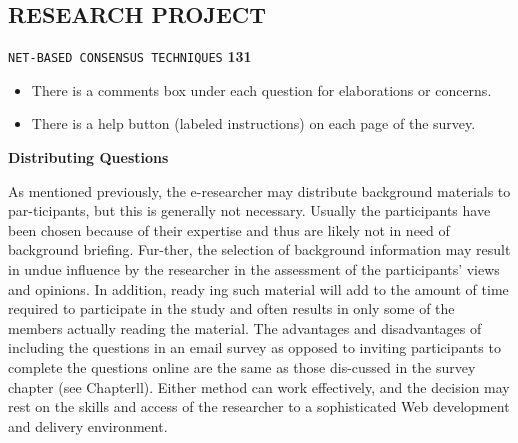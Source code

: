\documentclass[a4,9pt]{beamer}
\begin{document}
\begin{frame}
\section*{RESEARCH PROJECT}
\begin{flushright}
 \texttt{NET-BASED CONSENSUS TECHNIQUES} \hspace*{1cm} \textbf{131}
\end{flushright}

\vspace*{0.5cm}
\begin{itemize}
  \item There is a comments box under each question for elaborations or concerns.\\
  \item There is a help button (labeled instructions) on each page of the survey.\\
\end{itemize}

\vspace*{0.3cm}
\large{

\vspace{3mm}
\hspace{-1cm}
\textbf{Distributing Questions}\\
\vspace{3mm}
}
\small{
As mentioned previously, the e-researcher may distribute background materials to par-ticipants, but this is generally not necessary. Usually the participants have been chosen because of their expertise and thus are likely not in need of background briefing. Fur-ther, the selection of background information may result in undue influence by the researcher in the assessment of the participants' views and opinions. In addition, ready ing such material will add to the amount of time required to participate in the study and often results in only some of the members actually reading the material. The advantages and disadvantages of including the questions in an email survey as opposed to inviting participants to complete the questions online are the same as those dis-cussed in the survey chapter (see Chapterll). Either method can work effectively, and the decision may rest on the skills and access of the researcher to a sophisticated Web development and delivery environment.\\
}
\vspace*{0.3cm}
\end{frame}
\end{document}
